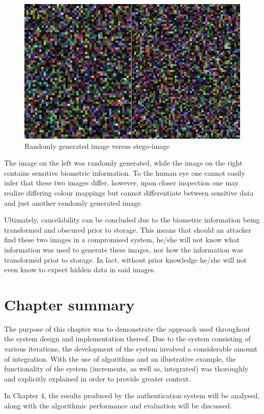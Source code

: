     
    \begin{figure}[htbp!] 
    \centering    
    \includegraphics[width=1.0\textwidth]{Chapter3/Figs/Figure3-7.png}
    \caption[Randomly generated image versus stego-image]{Randomly generated image versus stego-image}
    \label{fig:Randomly generated image versus stego-image}
    \end{figure}

The image on the left was randomly generated, while the image on the right contains sensitive biometric information. To the human eye one cannot easily infer that these two images differ, however, upon closer inspection one may realize differing colour mappings but cannot differentiate between sensitive data and just another randomly generated image.

Ultimately, cancelability can be concluded due to the biometric information being transformed and obscured prior to storage. This means that should an attacker find these two images in a compromised system, he/she will not know what information was used to generate these images, nor how the information was transformed prior to storage. In fact, without prior knowledge he/she will not even know to expect hidden data in said images.

\section{Chapter summary}

The purpose of this chapter was to demonstrate the approach used throughout the system design and implementation thereof. Due to the system consisting of various iterations, the development of the system involved a considerable amount of integration. With the use of algorithms and an illustrative example, the functionality of the system (increments, as well as, integrated) was thoroughly and explicitly explained in order to provide greater context. 

In Chapter 4, the results produced by the authentication system will be analysed, along with the algorithmic performance and evaluation will be discussed.

